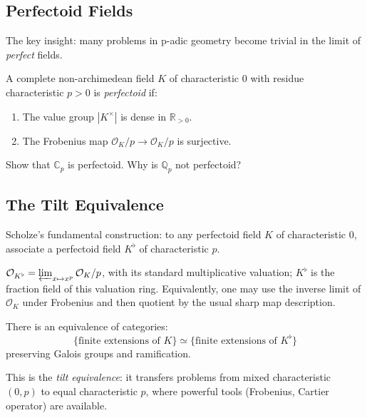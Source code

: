 \subsection{Perfectoid Fields}
The key insight: many problems in p-adic geometry become trivial in the limit of \emph{perfect} fields.

\begin{definition}
A complete non-archimedean field $K$ of characteristic $0$ with residue characteristic $p>0$ is \emph{perfectoid} if:
\begin{enumerate}
\item The value group $|K^\times|$ is dense in $\mathbb{R}_{>0}$.
\item The Frobenius map $\mathcal{O}_K/p \to \mathcal{O}_K/p$ is surjective.
\end{enumerate}
\end{definition}

\begin{exercise}[Basic]
Show that $\mathbb{C}_p$ is perfectoid. Why is $\mathbb{Q}_p$ not perfectoid?
\end{exercise}

\subsection{The Tilt Equivalence}
Scholze's fundamental construction: to any perfectoid field $K$ of characteristic $0$, associate a perfectoid field $K^\flat$ of characteristic $p$.

\begin{definition}[Tilt]
$\mathcal O_{K^\flat}=\varprojlim_{x\mapsto x^p}\mathcal O_K/p$, with its standard multiplicative valuation; $K^\flat$ is the fraction field of this valuation ring. Equivalently, one may use the inverse limit of $\mathcal O_K$ under Frobenius and then quotient by the usual sharp map description.
\end{definition}

\begin{theorem}
There is an equivalence of categories:
\[
\{\text{finite extensions of } K\} \simeq \{\text{finite extensions of } K^\flat\}
\]
preserving Galois groups and ramification.
\end{theorem}

This is the \emph{tilt equivalence}: it transfers problems from mixed characteristic $(0,p)$ to equal characteristic $p$, where powerful tools (Frobenius, Cartier operator) are available.

